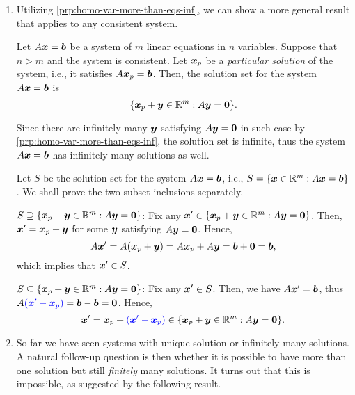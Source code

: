 \begin{enumerate}
\item Utilizing \cref{prp:homo-var-more-than-eqs-inf}, we can show a more
general result that applies to any consistent system.

\begin{proposition}
\label{prp:var-more-than-eqs-sol-set}
Let \(A\vb*{x}=\vb*{b}\) be a system of \(m\) linear equations in \(n\)
variables. Suppose that \(n>m\) and the system is consistent. Let
\(\vb*{x}_p\) be a \emph{particular solution} of the system, i.e., it
satisfies \(A\vb*{x}_p=\vb*{b}\). Then, the solution set for the system
\(A\vb*{x}=\vb*{b}\) is
\[
\{\vb*{x}_p+\vb*{y}\in\mathbb{R}^m:A\vb*{y}=\vb*{0}\}.
\]
\end{proposition}
\begin{note}
Since there are infinitely many \(\vb*{y}\) satisfying \(A\vb*{y}=\vb*{0}\)
in such case by \cref{prp:homo-var-more-than-eqs-inf}, the solution set is
infinite, thus the system \(A\vb*{x}=\vb*{b}\) has infinitely many solutions
as well.
\end{note}

\begin{pf}
Let \(S\) be the solution set for the system \(A\vb*{x}=\vb*{b}\), i.e.,
\(S=\{\vb*{x}\in\mathbb{R}^m:A\vb*{x}=\vb*{b}\}\). We shall prove the two subset
inclusions separately.

\underline{\(S\supseteq \{\vb*{x}_p+\vb*{y}\in\mathbb{R}^m:A\vb*{y}=\vb*{0}\}\)}:
Fix any \(\vb*{x}'\in\{\vb*{x}_p+\vb*{y}\in\mathbb{R}^m:A\vb*{y}=\vb*{0}\}\). Then,
\(\vb*{x}'=\vb*{x}_p+\vb*{y}\) for some \(\vb*{y}\) satisfying
\(A\vb*{y}=\vb*{0}\). Hence,
\[
A\vb*{x}'=A(\vb*{x}_p+\vb*{y})=A\vb*{x}_p+A\vb*{y}=\vb*{b}+\vb*{0}=\vb*{b},
\]
which implies that \(\vb*{x}'\in S\).

\underline{\(S\subseteq \{\vb*{x}_p+\vb*{y}\in\mathbb{R}^m:A\vb*{y}=\vb*{0}\}\)}:
Fix any \(\vb*{x}'\in S\). Then, we have \(A\vb*{x}'=\vb*{b}\), thus
\(A{\color{blue}(\vb*{x}'-\vb*{x}_p)}=\vb*{b}-\vb*{b}=\vb*{0}\). Hence,
\[
\vb*{x}'=\vb*{x}_p+{\color{blue}(\vb*{x}'-\vb*{x}_p)}
\in\{\vb*{x}_p+\vb*{y}\in\mathbb{R}^m:A\vb*{y}=\vb*{0}\}.
\]
\end{pf}

\item So far we have seen systems with unique solution or infinitely many
solutions. A natural follow-up question is then whether it is possible to have
more than one solution but still \emph{finitely} many solutions. It turns out
that this is impossible, as suggested by the following result.


\end{enumerate}
